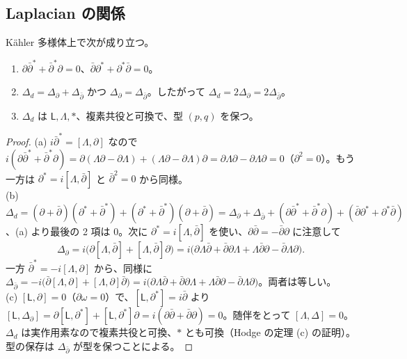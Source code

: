 \subsection{Laplacian の関係}
\begin{cor}\label{cor:laplace}\tP
Kähler 多様体上で次が成り立つ。
\begin{enumerate}
\item[(a)] $\partial\bar\partial^*+\bar\partial^*\partial=0$、$\bar\partial\partial^*+\partial^*\bar\partial=0$。
\item[(b)] $\Delta_d=\Delta_\partial+\Delta_{\bar\partial}$ かつ $\Delta_\partial=\Delta_{\bar\partial}$。したがって $\Delta_d=2\Delta_\partial=2\Delta_{\bar\partial}$。
\item[(c)] $\Delta_d$ は $\mathsf L,\Lambda,\ast$、複素共役と可換で、型 $(p,q)$ を保つ。
\end{enumerate}
\end{cor}
\begin{proof}
(a) $i\bar\partial^*=[\Lambda,\partial]$ なので $i(\partial\bar\partial^*+\bar\partial^*\partial)=\partial(\Lambda\partial-\partial\Lambda)+(\Lambda\partial-\partial\Lambda)\partial=\partial\Lambda\partial-\partial\Lambda\partial=0$（$\partial^2=0$）。もう一方は $\partial^*=i[\Lambda,\bar\partial]$ と $\bar\partial^2=0$ から同様。\\
(b) $\Delta_d=(\partial+\bar\partial)(\partial^*+\bar\partial^*)+(\partial^*+\bar\partial^*)(\partial+\bar\partial)=\Delta_\partial+\Delta_{\bar\partial}+(\partial\bar\partial^*+\bar\partial^*\partial)+(\bar\partial\partial^*+\partial^*\bar\partial)$、(a) より最後の 2 項は $0$。次に $\partial^*=i[\Lambda,\bar\partial]$ を使い、$\partial\bar\partial=-\bar\partial\partial$ に注意して
\[
\Delta_\partial=i\big(\partial[\Lambda,\bar\partial]+[\Lambda,\bar\partial]\partial\big)=i\big(\partial\Lambda\bar\partial+\bar\partial\partial\Lambda+\Lambda\bar\partial\partial-\bar\partial\Lambda\partial\big).
\]
一方 $\bar\partial^*=-i[\Lambda,\partial]$ から、同様に $\Delta_{\bar\partial}=-i\big(\bar\partial[\Lambda,\partial]+[\Lambda,\partial]\bar\partial\big)=i\big(\partial\Lambda\bar\partial+\bar\partial\partial\Lambda+\Lambda\bar\partial\partial-\bar\partial\Lambda\partial\big)$。両者は等しい。\\
(c) $[\mathsf L,\partial]=0$（$\partial\omega=0$）で、$[\mathsf L,\partial^*]=i\bar\partial$ より $[\mathsf L,\Delta_\partial]=\partial[\mathsf L,\partial^*]+[\mathsf L,\partial^*]\partial=i(\partial\bar\partial+\bar\partial\partial)=0$。随伴をとって $[\Lambda,\Delta]=0$。$\Delta_d$ は実作用素なので複素共役と可換、$\ast$ とも可換（Hodge の定理 (c) の証明）。型の保存は $\Delta_{\bar\partial}$ が型を保つことによる。
\end{proof}
\begin{center}
\end{center}

